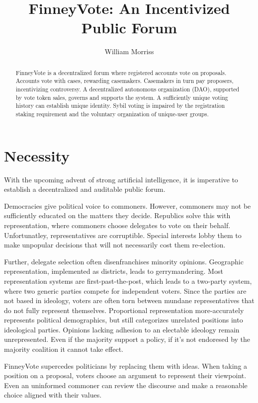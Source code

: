 \documentclass{article}
\title{FinneyVote: An Incentivized Public Forum}
\author{William Morriss}
\begin{document}
\maketitle
\begin{abstract}
FinneyVote is a decentralized forum where registered accounts vote on proposals.
Accounts vote with cases, rewarding casemakers.
Casemakers in turn pay proposers, incentivizing controversy.
A decentralized autonomous organization (DAO), supported by vote token sales, governs and supports the system.
A sufficiently unique voting history can establish unique identity.
Sybil voting is impaired by the registration staking requirement and the voluntary organization of unique-user groups.
\end{abstract}
\section{Necessity}
With the upcoming advent of strong artificial intelligence, it is imperative to establish a decentralized and auditable public forum.
\par
Democracies give political voice to commoners.
However, commoners may not be sufficiently educated on the matters they decide.
Republics solve this with representation, where commoners choose delegates to vote on their behalf.
Unfortunatley, representatives are corruptible.
Special interests lobby them to make unpopular decisions that will not necessarily cost them re-election.
\par
Further, delegate selection often disenfranchises minority opinions.
Geographic representation, implemented as districts, leads to gerrymandering.
Most representation systems are first-past-the-post, which leads to a two-party system, where two generic parties compete for independent voters.
Since the parties are not based in ideology, voters are often torn between mundane representatives that do not fully represent themselves.
Proportional representation more-accurately represents political demographics, but still categorizes unrelated positions into ideological parties.
Opinions lacking adhesion to an electable ideology remain unrepresented.
Even if the majority support a policy, if it's not endoresed by the majority coalition it cannot take effect.
\par
FinneyVote supercedes politicians by replacing them with ideas.
When taking a position on a proposal, voters choose an argument to represent their viewpoint.
Even an uninformed commoner can review the discourse and make a reasonable choice aligned with their values.
\end{document}
